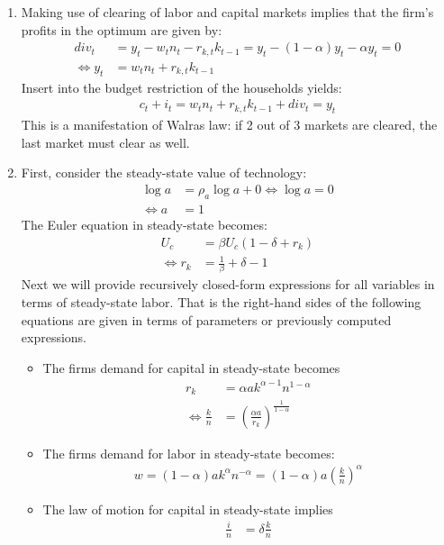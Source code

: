 \begin{enumerate}
\item Making use of clearing of labor and capital markets implies that the firm's profits in the optimum are given by:
\begin{align*}
{div}_t &= y_t - w_t n_{t} - r_{k,t} k_{t-1} = y_t - (1-\alpha)y_t - \alpha y_t = 0
\\
\Leftrightarrow y_t &= w_t n_{t} + r_{k,t} k_{t-1}
\end{align*}
Insert into the budget restriction of the households yields:
\begin{align*}
c_t + i_t = w_t n_{t} + r_{k,t} k_{t-1} + {div}_t = y_t
\end{align*}
This is a manifestation of Walras law: if 2 out of 3 markets are cleared, the last market must clear as well.

\item First, consider the steady-state value of technology:
\begin{align*}
\log{a}&=\rho_a \log{a} + 0 \Leftrightarrow \log{a} = 0
\\
\Leftrightarrow a &= 1 
\end{align*}
The Euler equation in steady-state becomes:
\begin{align*}
U_c &= \beta U_c (1-\delta+r_k)
\\
\Leftrightarrow r_k &= \frac{1}{\beta} + \delta - 1
\end{align*}
Next we will provide recursively closed-form expressions for all variables in terms of steady-state labor.
That is the right-hand sides of the following equations are given in terms of parameters or previously computed expressions.
\begin{itemize}
	\item The firms demand for capital in steady-state becomes
	\begin{align*}
	r_k &= \alpha a k^{\alpha-1} n^{1-\alpha}
	\\
	\Leftrightarrow \frac{k}{n} &= \left(\frac{\alpha a}{r_k}\right)^{\frac{1}{1-\alpha}}
	\end{align*}
	\item The firms demand for labor in steady-state becomes:
	\begin{align*}
	w = (1-\alpha) a k^\alpha n^{-\alpha} = (1-\alpha)a \left(\frac{k}{n}\right)^\alpha
	\end{align*}
	\item The law of motion for capital in steady-state implies
	\begin{align*}
	\frac{i}{n} &= \delta\frac{k}{n}
	\end{align*}

\end{itemize}
\end{enumerate}
